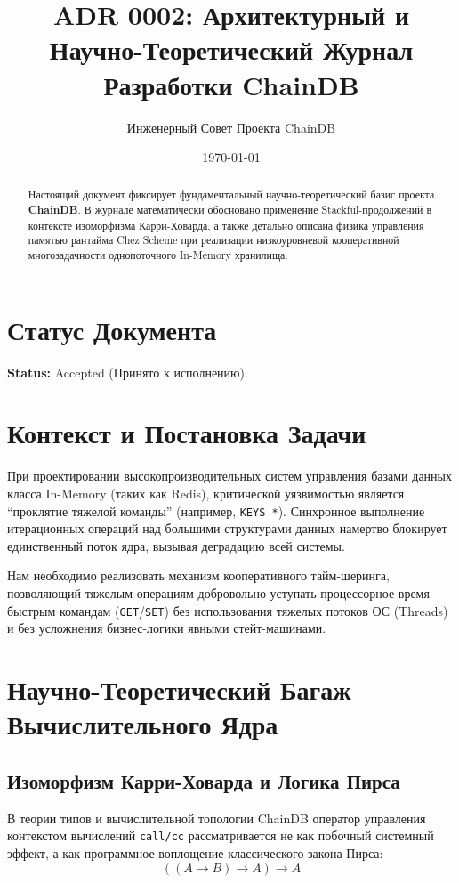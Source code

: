 \documentclass[12pt,a4paper]{article}
\title{\textbf{ADR 0002: Архитектурный и Научно-Теоретический Журнал Разработки ChainDB}}
\author{Инженерный Совет Проекта ChainDB}
\date{\today}
\begin{document}
\maketitle

\begin{abstract}
Настоящий документ фиксирует фундаментальный научно-теоретический базис проекта \textbf{ChainDB}. В журнале математически обосновано применение Stackful-продолжений в контексте изоморфизма Карри-Ховарда, а также детально описана физика управления памятью рантайма Chez Scheme при реализации низкоуровневой кооперативной многозадачности однопоточного In-Memory хранилища.
\end{abstract}

\section{Статус Документа}
\textbf{Status:} Accepted (Принято к исполнению).

\section{Контекст и Постановка Задачи}
При проектировании высокопроизводительных систем управления базами данных класса In-Memory (таких как Redis), критической уязвимостью является ``проклятие тяжелой команды'' (например, \texttt{KEYS *}). Синхронное выполнение итерационных операций над большими структурами данных намертво блокирует единственный поток ядра, вызывая деградацию всей системы. 

Нам необходимо реализовать механизм кооперативного тайм-шеринга, позволяющий тяжелым операциям добровольно уступать процессорное время быстрым командам (\texttt{GET}/\texttt{SET}) без использования тяжелых потоков ОС (Threads) и без усложнения бизнес-логики явными стейт-машинами.

\section{Научно-Теоретический Багаж Вычислительного Ядра}

\subsection{Изоморфизм Карри-Ховарда и Логика Пирса}
В теории типов и вычислительной топологии ChainDB оператор управления контекстом вычислений \texttt{call/cc} рассматривается не как побочный системный эффект, а как программное воплощение классического закона Пирса:
\begin{equation}
((A \to B) \to A) \to A
\end{equation}
\end{document}
